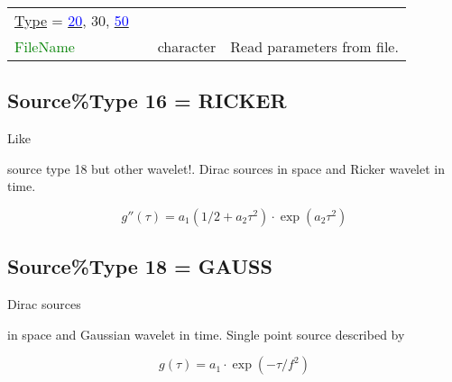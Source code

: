 \documentclass[12pt,twoside]{article}
\begin{document}
\begin{table}[H]
\begin{center}
\begin{tabular}{|p{4cm}|p{2.7cm}|p{2cm}|p{4cm}|}
\uline{Type} = \hyperlink{src20}{\textcolor{blue}{20}}, 30, \hyperlink{src50}{\textcolor{blue}{50}} & & &\\
\textcolor{green}{FileName} & & character & Read parameters from file.\\
\hline
\end{tabular}
\end{center}
\label{src2-table}
\end{table}


\newpage

\subsection{Source\%Type 16 = RICKER}
\hypertarget{src16}{Like} source type 18 but other wavelet!.
Dirac sources in space and Ricker wavelet in time.

\begin{equation}
   g''(\tau) = a_1\left(1/2 + a_2 \tau^2 \right) \cdot \exp(a_2 \tau^2)
\end{equation}


\subsection{Source\%Type 18 = GAUSS}
\hypertarget{src18}{Dirac sources} in space and Gaussian wavelet in time.
Single point source described by

\begin{equation}
   g(\tau) = a_1 \cdot \exp(-\tau/f^2)
\end{equation}
\end{document}
